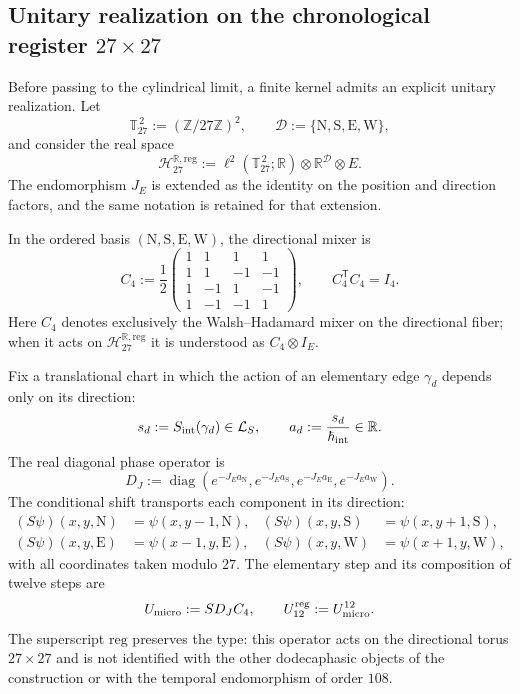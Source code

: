 \subsection{Unitary realization on the chronological register
\texorpdfstring{\(27\times27\)}{27 x 27}}
\label{sec:realizacion-unitaria-registro-27-rev3}

Before passing to the cylindrical limit, a finite kernel admits an explicit
unitary realization. Let
\[
 \mathbb T_{27}^{\,2}:=(\mathbb Z/27\mathbb Z)^2,
 \qquad
 \mathcal D:=\{\mathrm N,\mathrm S,\mathrm E,\mathrm W\},
\]
and consider the real space
\[
 \mathcal H_{27}^{\mathbb R,\mathrm{reg}}
 :=\ell^2(\mathbb T_{27}^{\,2};\mathbb R)
   \otimes\mathbb R^{\mathcal D}\otimes E.
\]
The endomorphism \(J_E\) is extended as the identity on the position and
direction factors, and the same notation is retained for that extension.

In the ordered basis
\((\mathrm N,\mathrm S,\mathrm E,\mathrm W)\), the directional mixer is
\begin{equation}
 C_4:=\frac12
 \begin{pmatrix}
  1&1&1&1\\
  1&1&-1&-1\\
  1&-1&1&-1\\
  1&-1&-1&1
 \end{pmatrix},
 \qquad C_4^{\mathsf T}C_4=I_4.
 \label{eq:mezclador-walsh-registro-27-rev3}
\end{equation}
Here \(C_4\) denotes exclusively the Walsh--Hadamard mixer on the
directional fiber; when it acts on
\(\mathcal H_{27}^{\mathbb R,\mathrm{reg}}\) it is understood as
\(C_4\otimes I_E\).

Fix a translational chart in which the action of an elementary edge
\(\gamma_d\) depends only on its direction:
\[
 s_d:=S_{\rm int}(\gamma_d)\in\mathcal L_S,
 \qquad
 a_d:=\frac{s_d}{\hbar_{\rm int}}\in\mathbb R.
\]
The real diagonal phase operator is
\[
 D_J:=\operatorname{diag}
 \left(
  e^{-J_Ea_{\mathrm N}},
  e^{-J_Ea_{\mathrm S}},
  e^{-J_Ea_{\mathrm E}},
  e^{-J_Ea_{\mathrm W}}
 \right).
\]
The conditional shift transports each component in its direction:
\begin{align*}
 (S\psi)(x,y,\mathrm N)&=\psi(x,y-1,\mathrm N),&
 (S\psi)(x,y,\mathrm S)&=\psi(x,y+1,\mathrm S),\\
 (S\psi)(x,y,\mathrm E)&=\psi(x-1,y,\mathrm E),&
 (S\psi)(x,y,\mathrm W)&=\psi(x+1,y,\mathrm W),
\end{align*}
with all coordinates taken modulo \(27\). The elementary step and its
composition of twelve steps are
\begin{equation}
 U_{\rm micro}:=S D_J C_4,
 \qquad
 U_{12}^{\mathrm{reg}}:=U_{\rm micro}^{12}.
 \label{eq:paso-unitario-registro-27-rev3}
\end{equation}
The superscript \(\mathrm{reg}\) preserves the type: this operator acts on
the directional torus \(27\times27\) and is not identified with the other
dodecaphasic objects of the construction or with the temporal endomorphism of order \(108\).


